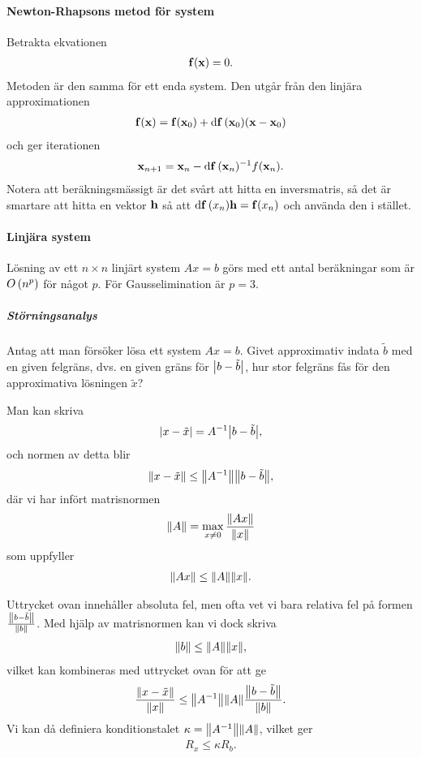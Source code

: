 \paragraph{Newton-Rhapsons metod för system}
Betrakta ekvationen
\begin{align*}
	\vb{f}(\vb{x}) = 0.
\end{align*}
Metoden är den samma för ett enda system. Den utgår från den linjära approximationen
\begin{align*}
	\vb{f}(\vb{x}) = \vb{f}(\vb{x}_{0}) + \dd{\vb{f}}(\vb{x}_{0})(\vb{x} - \vb{x}_{0})
\end{align*}
och ger iterationen
\begin{align*}
	\vb{x}_{n + 1} = \vb{x}_{n} - \dd{\vb{f}}(\vb{x}_{n})^{-1}f(\vb{x}_{n}).
\end{align*}
Notera att beräkningsmässigt är det svårt att hitta en inversmatris, så det är smartare att hitta en vektor $\vb{h}$ så att $\dd{\vb{f}}(x_{n})\vb{h} = \vb{f}(x_{n})$ och använda den i stället.

\paragraph{Linjära system}
Lösning av ett $n\times n$ linjärt system $Ax = b$ görs med ett antal beräkningar som är $O\left(n^{p}\right)$ för något $p$. För Gausselimination är $p = 3$.

\subparagraph{Störningsanalys}
Antag att man försöker lösa ett system $Ax = b$. Givet approximativ indata $\tilde{b}$ med en given felgräns, dvs. en given gräns för $\abs{b - \tilde{b}}$, hur stor felgräns fås för den approximativa lösningen $\tilde{x}$?

Man kan skriva
\begin{align*}
	\abs{x - \tilde{x}} = A^{-1}\abs{b - \tilde{b}},
\end{align*}
och normen av detta blir
\begin{align*}
	\norm{x - \tilde{x}} \leq \norm{A^{-1}}\norm{b - \tilde{b}},
\end{align*}
där vi har infört matrisnormen
\begin{align*}
	\norm{A} = \max\limits_{x \neq 0}\frac{\norm{Ax}}{\norm{x}}
\end{align*}
som uppfyller
\begin{align*}
	\norm{Ax} \leq \norm{A}\norm{x}.
\end{align*}

Uttrycket ovan innehåller absoluta fel, men ofta vet vi bara relativa fel på formen $\frac{\norm{b - \tilde{b}}}{\norm{b}}$. Med hjälp av matrisnormen kan vi dock skriva
\begin{align*}
	\norm{b} \leq \norm{A}\norm{x},
\end{align*}
vilket kan kombineras med uttrycket ovan för att ge
\begin{align*}
	\frac{\norm{x - \tilde{x}}}{\norm{x}} \leq \norm{A^{-1}}\norm{A}\frac{\norm{b - \tilde{b}}}{\norm{b}}.
\end{align*}
Vi kan då definiera konditionstalet $\kappa = \norm{A^{-1}}\norm{A}$, vilket ger
\begin{align*}
	R_{x} \leq \kappa R_{b}.
\end{align*}
